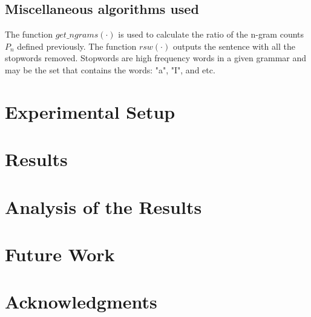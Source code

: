 \documentclass[11pt,letterpaper]{article}
\begin{document}
\subsection{Miscellaneous algorithms used}

The function $get\_ngrams(\cdot)$ is used to calculate the ratio of the n-gram counts $P_{n}$ defined previously. The function $rsw(\cdot)$ outputs the sentence with all the stopwords removed. Stopwords are high frequency words in a given grammar and may be the set that contains the words: "a", "I", and etc.


\section{Experimental Setup}



\section{Results}


\section{Analysis of the Results}

\section{Future Work}

\section*{Acknowledgments}



\end{document}
